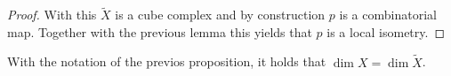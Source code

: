 \begin{proof}
  With this \(\tilde X\) is a cube complex and by construction \(p\) is a combinatorial map. Together with the previous lemma this yields that \(p\) is a local isometry.
\end{proof}

\begin{cor}
  With the notation of the previos proposition, it holds that \(\dim X = \dim \tilde X\).
\end{cor}


